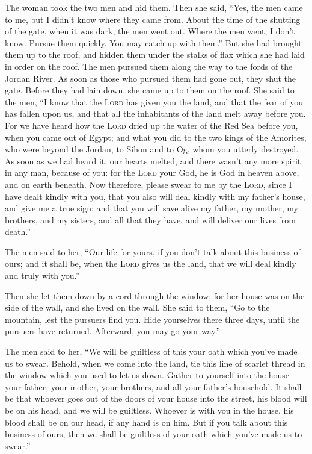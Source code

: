  The woman took the two men and hid them. Then she said,
``Yes, the men came to me, but I didn't know where they came from.
 About the time of the shutting of the gate, when it was
dark, the men went out. Where the men went, I don't know. Pursue them
quickly. You may catch up with them.''  But she had
brought them up to the roof, and hidden them under the stalks of flax
which she had laid in order on the roof.  The men pursued
them along the way to the fords of the Jordan River. As soon as those
who pursued them had gone out, they shut the gate.  Before
they had lain down, she came up to them on the roof.  She
said to the men, ``I know that the \textsc{Lord} has given you the land,
and that the fear of you has fallen upon us, and that all the
inhabitants of the land melt away before you.  For we
have heard how the \textsc{Lord} dried up the water of the Red Sea
before you, when you came out of Egypt; and what you did to the two
kings of the Amorites, who were beyond the Jordan, to Sihon and to Og,
whom you utterly destroyed.  As soon as we had heard it,
our hearts melted, and there wasn't any more spirit in any man, because
of you: for the \textsc{Lord} your God, he is God in heaven above, and
on earth beneath.  Now therefore, please swear to me by
the \textsc{Lord}, since I have dealt kindly with you, that you also
will deal kindly with my father's house, and give me a true sign;
 and that you will save alive my father, my mother, my
brothers, and my sisters, and all that they have, and will deliver our
lives from death.''

 The men said to her, ``Our life for yours, if you don't
talk about this business of ours; and it shall be, when the
\textsc{Lord} gives us the land, that we will deal kindly and truly with
you.''

 Then she let them down by a cord through the window; for
her house was on the side of the wall, and she lived on the wall.
 She said to them, ``Go to the mountain, lest the
pursuers find you. Hide yourselves there three days, until the pursuers
have returned. Afterward, you may go your way.''

 The men said to her, ``We will be guiltless of this your
oath which you've made us to swear.  Behold, when we come
into the land, tie this line of scarlet thread in the window which you
used to let us down. Gather to yourself into the house your father, your
mother, your brothers, and all your father's household. 
It shall be that whoever goes out of the doors of your house into the
street, his blood will be on his head, and we will be guiltless. Whoever
is with you in the house, his blood shall be on our head, if any hand is
on him.  But if you talk about this business of ours,
then we shall be guiltless of your oath which you've made us to swear.''

